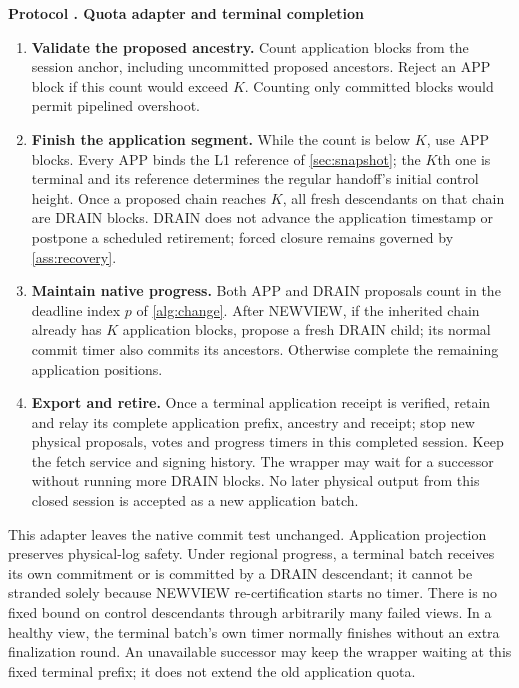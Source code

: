 \documentclass[11pt,a4paper,onecolumn]{article}
\newcounter{protocol}
\newenvironment{protocol}[2]{\refstepcounter{protocol}\label{#1}
\begin{mdframed}[nobreak=true,linewidth=.6pt,skipabove=9pt,skipbelow=9pt,
innertopmargin=7pt,innerbottommargin=7pt]\small
\noindent\textbf{Protocol \theprotocol. #2}\par\smallskip}{\end{mdframed}}
\begin{document}
\begin{protocol}{alg:drain}{Quota adapter and terminal completion}
\begin{enumerate}[label=\textbf{Q\arabic*.}]
\item \textbf{Validate the proposed ancestry.} Count application blocks
from the session anchor, including uncommitted proposed ancestors. Reject
an APP block if this count would exceed $K$. Counting only committed
blocks would permit pipelined overshoot.
\item \textbf{Finish the application segment.} While the count is below
$K$, use APP blocks. Every APP binds the L1 reference of
\cref{sec:snapshot}; the $K$th one is terminal and its reference determines
the regular handoff's initial control height. Once a proposed chain reaches $K$,
all fresh descendants on that chain are DRAIN blocks.
DRAIN does not advance the application timestamp or postpone a scheduled
retirement; forced closure remains governed by \cref{ass:recovery}.
\item \textbf{Maintain native progress.} Both APP and DRAIN proposals
count in the deadline index $p$ of \cref{alg:change}. After NEWVIEW,
if the inherited chain already has $K$ application blocks, propose a
fresh DRAIN child; its normal commit timer also commits its ancestors.
Otherwise complete the remaining application positions.
\item \textbf{Export and retire.} Once a terminal application receipt
is verified, retain and relay its complete application prefix, ancestry
and receipt; stop new physical proposals, votes and progress timers in this
completed session. Keep the fetch service and signing history. The wrapper
may wait for a successor without running more DRAIN blocks. No later physical output
from this closed session is accepted as a new application batch.
\end{enumerate}
\end{protocol}
This adapter leaves the native commit test unchanged. Application projection
preserves physical-log safety. Under regional progress, a terminal batch
receives its own commitment or is committed by a DRAIN descendant; it
cannot be stranded solely because NEWVIEW re-certification starts no timer.
There is no fixed bound on control descendants through arbitrarily many
failed views. In a healthy view, the terminal batch's own timer normally
finishes without an extra finalization round. An unavailable successor
may keep the wrapper waiting at this fixed terminal prefix; it does not
extend the old application quota.
\end{document}
